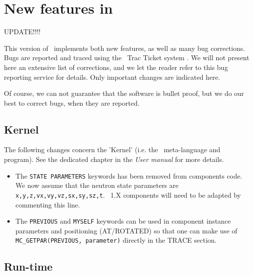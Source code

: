 
\chapter{New features in \MCS\ \version\ }
\label{c:changes}

UPDATE!!!!

This version of \MCS\ implements both new features, as well as many bug corrections. Bugs are reported and traced using the \MCS\ Trac Ticket system \cite{mczilla_webpage}. We will not present here an extensive list of corrections, and we let the reader refer to this bug reporting service for details. Only important changes are indicated here.

Of course, we can not guarantee that the software is bullet proof, but we do our best to correct bugs, when they are reported.


\section{Kernel}
\label{s:new-features:kernel}

The following changes concern the 'Kernel' (i.e. the \MCS\ meta-language and program). See the dedicated chapter in the {\it User manual} for more details.

\begin{itemize}
\item The \verb+STATE PARAMETERS+ keywords has been removed from components code. We now assume that the neutron state parameters are \verb+x,y,z,vx,vy,vz,sx,sy,sz,t+. \MCS\ 1.X components will need to be adapted by commenting this line.
\item The \verb+PREVIOUS+ and \verb+MYSELF+ keywords can be used in component instance parameters and positioning (AT/ROTATED) so that one can make use of \verb+MC_GETPAR(PREVIOUS, parameter)+ directly in the TRACE section.
\end{itemize}

\section{Run-time}
\label{s:new-features:run-time}

